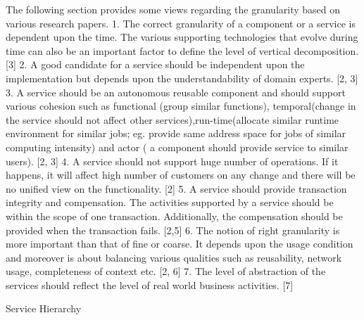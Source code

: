 The following section provides some views regarding the granularity based on various research papers.
1. The correct granularity of a component or a service is dependent upon the time. The various supporting technologies that evolve during time can also be an important factor to define the level of vertical decomposition. [3]
2. A good candidate for a service should be independent upon the implementation but depends upon the understandability of domain experts.
[2, 3]
3. A service should be an autonomous reusable component and should support various cohesion such as functional (group similar functions), temporal(change in the service should not affect other services),run-time(allocate similar runtime environment for similar jobs; eg. provide same address space for jobs of similar computing intensity) and actor ( a component should provide service to similar users).
[2, 3]
4. A service should not support huge number of operations. If it happens, it will affect high number of customers on any change and there will be no unified view on the functionality. [2]
5. A service should provide transaction integrity and compensation. The activities supported by a service should be within the scope of one transaction. Additionally, the compensation should be provided when the transaction fails. [2,5]
6. The notion of right granularity is more important than that of fine or coarse. It depends upon the usage condition and moreover is about balancing various qualities such as reusability, network usage, completeness of context etc. [2, 6]
7. The level of abstraction of the services should reflect the level of real world business activities. [7]



Service Hierarchy

 